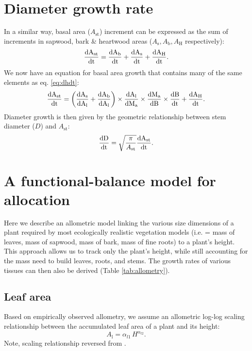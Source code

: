 \documentclass[10pt,twoside]{article}
\begin{document}
\section{Diameter growth rate}

In a similar way, basal area ($A_\textrm{st}$) increment can be
expressed as the sum of increments in sapwood, bark \& heartwood areas
($A_\textrm{s}, A_\textrm{b}, A_\textrm{H}$ respectively):
$$\frac{\rm{d}A_\textrm{st}}{\rm{d}t} = \frac{\rm{d}A_\textrm{b}}{\rm{d}t} + \frac{\rm{d}A_\textrm{s}}{\rm{d}t} + \frac{\rm{d}A_\textrm{H}}{\rm{d}t}.$$
We now have an equation for basal area growth that contains many of the same
elements as eq. \ref{eq:dhdt}:
\begin{equation}\label{eq:dast}
\frac{\rm{d}A_\textrm{st}}{\rm{d}t} = \left(\frac{\rm{d}A_\textrm{s}}{\rm{d}A_\textrm{l}} + \frac{\rm{d}A_\textrm{b}}{\rm{d}A_\textrm{l}}\right) \times
\frac{\rm{d}A_\textrm{l}}{\rm{d}M_\textrm{a}} \times \frac{\rm{d}M_\textrm{a}}{\rm{d}B} \times \frac{\rm{d}B}{\rm{d}t} + \frac{\rm{d}A_\textrm{H}}{\rm{d}t} .
\end{equation}
Diameter growth is then given by the geometric relationship between stem
diameter ($D$) and $A_\textrm{st}$:
\begin{equation} \label{eq:dDdt}
\frac{\rm{d}D}{\rm{d}t} = \sqrt{\frac{\pi}{A_\textrm{st}}} \frac{\rm{d}A_\textrm{st}}{\rm{d}t}.
\end{equation}

\section{A functional-balance model for
allocation}\label{a-functional-balance-model-for-allocation}

Here we describe an allometric model linking the various size dimensions
of a plant required by most ecologically realistic vegetation models
(i.e. = mass of leaves, mass of sapwood, mass of bark, mass of fine
roots) to a plant's height. This approach allows us to track only the
plant's height, while still accounting for the mass need to build
leaves, roots, and stems. The growth rates of various tissues can then
also be derived (Table \ref{tab:allometry}).

\subsection{Leaf area}\label{leaf-area}

Based on empirically observed allometry, we assume an allometric log-log
scaling relationship between the accumulated leaf area of a plant and
its height:
\begin{equation}\label{eq:ha}
A_\textrm{l} = \alpha_{l1} \, H^{\alpha_{l2}}.
\end{equation}
Note, scaling relationship reversed from \citep{Falster-2011}.
\end{document}
